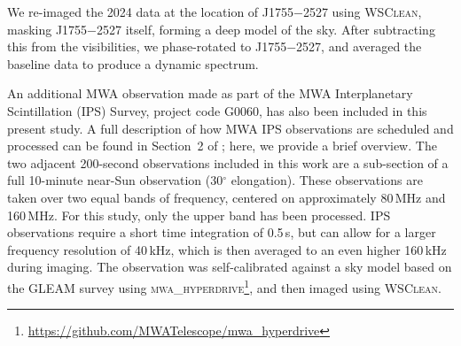\documentclass[preprint2,linenumbers]{aastex631}
\newcommand{\src}{J1755$-$2527}
\begin{document}
We re-imaged the 2024 data at the location of \src{} using \textsc{WSClean}, masking \src{} itself, forming a deep model of the sky. After subtracting this from the visibilities, we phase-rotated to \src{}, and averaged the baseline data to produce a dynamic spectrum.



An additional MWA observation made as part of the MWA Interplanetary Scintillation (IPS) Survey, project code G0060, has also been included in this present study. 
A full description of how MWA IPS observations are scheduled and processed can be found in Section~2 of \citet{Morgan2022}; here, we provide a brief overview.
The two adjacent 200-second observations included in this work are a sub-section of a full 10-minute near-Sun observation (30$^{\circ}$ elongation).
These observations are taken over two equal bands of frequency, centered on approximately 80\,MHz and 160\,MHz. For this study, only the upper band has been processed. 
IPS observations require a short time integration of 0.5\,s, but can allow for a larger frequency resolution of 40\,kHz, which is then averaged to an even higher 160\,kHz during imaging. %
The observation was self-calibrated against a sky model based on the GLEAM survey \citep{Hurley-Walker2017} using \textsc{mwa\_hyperdrive}\footnote{\url{https://github.com/MWATelescope/mwa_hyperdrive}}, and then imaged using \textsc{WSClean}.
\end{document}
